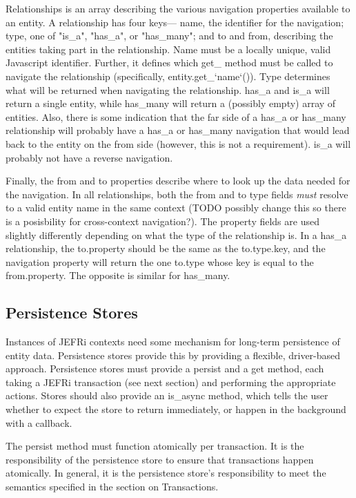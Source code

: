 \documentclass{article}
\begin{document}
Relationships is an array describing the various navigation properties available
to an entity. A relationship has four keys--- name, the identifier for the
navigation; type, one of "is\_a", "has\_a", or "has\_many"; and to and from,
describing the entities taking part in the relationship. Name must be a locally
unique, valid Javascript identifier. Further, it defines which get\_ method must
be called to navigate the relationship (specifically, entity.get\_`name`()).
Type determines what will be returned when navigating the relationship. has\_a
and is\_a will return a single entity, while has\_many will return a (possibly
empty) array of entities. Also, there is some indication that the far side of a
has\_a or has\_many relationship will probably have a has\_a or has\_many
navigation that would lead back to the entity on the from side (however, this is
not a requirement). is\_a will probably not have a reverse navigation.

Finally, the from and to properties describe where to look up the data needed
for the navigation. In all relationships, both the from and to type fields {\it
must} resolve to a valid entity name in the same context (TODO possibly change
this so there is a posisbility for cross-context navigation?). The property
fields are used slightly differently depending on what the type of the
relationship is. In a has\_a relationship, the to.property should be the same as
the to.type.key, and the navigation property will return the one to.type whose
key is equal to the from.property. The opposite is similar for has\_many.

\subsection{Persistence Stores}
Instances of JEFRi contexts need some mechanism for long-term persistence of
entity data. Persistence stores provide this by providing a flexible,
driver-based approach.
Persistence stores must provide a persist and a get
method, each taking a JEFRi transaction (see next section) and performing the
appropriate actions. Stores should also provide an is\_async method, which tells
the user whether to expect the store to return immediately, or happen in the
background with a callback.

The persist method must function atomically per transaction. It is the
responsibility of the persistence store to ensure that transactions happen
atomically. In general, it is the persistence store's responsibility to meet the
semantics specified in the section on Transactions.
\end{document}
